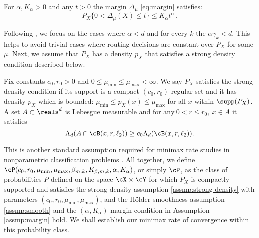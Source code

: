 \begin{assumption}\label{assmp:margin}
    For $\alpha, K_\alpha >0$ and any $t > 0$ the margin $\Delta_{\mu}$ \eqref{eq:margin} satisfies: \begin{equation}
        P_X \big\{0 < \Delta _\mu(X) \le t\big \}  \le K_\alpha t^{\alpha}\,. 
    \end{equation}
\end{assumption}
Following \citet{audibert2007Fast}, we focus on the cases where $\alpha < d$ and for every $k$ the $\alpha \gamma_k < d$. This helps to avoid trivial cases where routing decisions are constant over $P_X$ for some $\mu$.  %
Next, we assume that $P_X$ has a density $p_X$ that satisfies a strong density condition described below.
\begin{assumption} \label{assmp:strong-density}
Fix constants $c_0, r_0> 0$ and $0 \le \mu_{\min}  \le \mu_{\max} < \infty$. We say $P_X$ satisfies the strong density condition if its support is a compact $(c_0, r_0)$-regular set and it has density $p_X$ which is bounded: $\mu_{\min} \le p_X (x) \le \mu_{\max} $ for all $x$ within $\supp(P_X)$. A set $A \subset \reals^d$ is Lebesgue measurable and %
$\text{for any} ~ 0 < r \le r_0, ~  x \in A$ it satisfies
\begin{equation}
    \Lambda_d (A \cap \cB(x, r, \ell_2)) \ge c_0 \Lambda_d(\cB(x, r, \ell_2)). %
\end{equation} %
\end{assumption}
This is another standard assumption required for minimax rate studies in nonparametric classification problems \citep{audibert2007Fast,cai2019Transfer}. All together, we define $\cP(c_0, r_0, \mu_{\min}, \mu_{\max}, \beta_{m ,k}, K_{\beta, m, k}, \alpha, K_\alpha)$, or simply $\cP$, as the class of probabilities $P$ defined on the space $\cX \times \cY$ for which $P_X$  is  compactly supported and satisfies the strong density assumption \ref{assmp:strong-density} with parameters $(c_0, r_0, \mu_{\min}, \mu_{\max})$, and the H\"older smoothness assumption \ref{assmp:smooth} and the $(\alpha, K_\alpha)$-margin condition in Assumption \ref{assmp:margin} hold. We shall establish our minimax rate of convergence within this probability class. 
